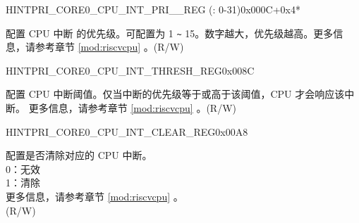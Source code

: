 \begin{register}{H}{INTPRI\_CORE0\_CPU\_INT\_PRI\_\_REG (: 0-31)}{0x000C+0x4*}\label{regdesc:INTPRICORE0CPUINTPRINREG}
%
%
\regnewline%
\begin{regdesc}\begin{reglist}
\label{fielddesc:INTERRUPTCORENCPUPRI0MAP}\item [INTPRI\_CORE0\_CPU\_PRI\_\regindex{n}\_MAP] 配置 CPU 中断  的优先级。可配置为 1 \verb+~+ 15。数字越大，优先级越高。更多信息，请参考章节 \ref{mod:riscvcpu} \textit{}。(R/W)
\end{reglist}\end{regdesc}
\end{register}


\begin{register}{H}{INTPRI\_CORE0\_CPU\_INT\_THRESH\_REG}{0x008C}\label{regdesc:INTPRICORE0CPUINTTHRESHREG}
%
%
\regnewline%
\begin{regdesc}\begin{reglist}
\label{fielddesc:INTPRICORE0CPUINTTHRESH}\item [INTPRI\_CORE0\_CPU\_INT\_THRESH] 配置 CPU 中断阈值。仅当中断的优先级等于或高于该阈值，CPU 才会响应该中断。 更多信息，请参考章节 \ref{mod:riscvcpu} \textit{}。(R/W)
\end{reglist}\end{regdesc}
\end{register}




\begin{register}{H}{INTPRI\_CORE0\_CPU\_INT\_CLEAR\_REG}{0x00A8}\label{regdesc:INTPRICORE0CPUINTCLEARREG}
%
\regnewline%
\begin{regdesc}\begin{reglist}
\label{fielddesc:INTPRICORE0CPUINTCLEAR}\item [INTPRI\_CORE0\_CPU\_INT\_CLEAR] 配置是否清除对应的 CPU 中断。\\
0：无效\\
1：清除\\
更多信息，请参考章节 \ref{mod:riscvcpu} \textit{}。\\
(R/W)
\end{reglist}\end{regdesc}
\end{register}

